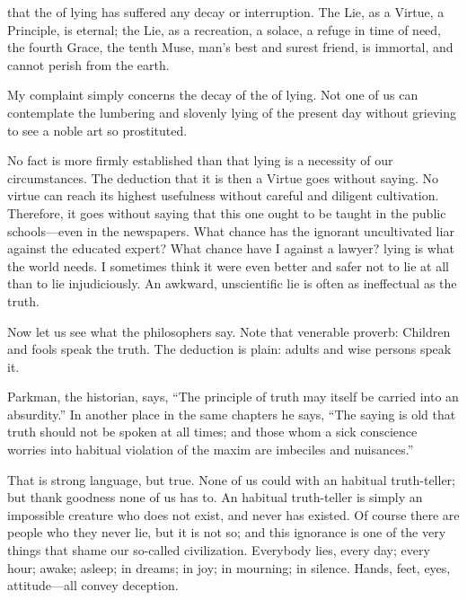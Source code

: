 \documentclass{novelette}
\begin{document}
\begin{opening}
\null\null\null\null\null\null
{}
\null
{}
\null\null\null\null\null
\end{opening}

 that the  of lying has
suffered any decay or interruption. The Lie, as a Virtue, a
Principle, is eternal; the Lie, as a recreation, a solace, a refuge in
time of need, the fourth Grace, the tenth Muse, man's best and surest
friend, is immortal, and cannot perish from the earth.

My complaint simply concerns the decay of the  of lying.
Not one of us can contemplate the lumbering and slovenly lying of the
present day without grieving to see a noble art so prostituted.

No fact is more firmly established than that lying is a necessity of our
circumstances. The deduction that it is then a Virtue goes without
saying. No virtue can reach its highest usefulness without careful and
diligent cultivation. Therefore, it goes without saying that this one
ought to be taught in the public schools---even in the newspapers. What
chance has the ignorant uncultivated liar against the educated expert?
What chance have I against a lawyer?  lying
is what the world needs. I sometimes think it were even better and safer
not to lie at all than to lie injudiciously. An awkward, unscientific
lie is often as ineffectual as the truth.

Now let us see what the philosophers say. Note that venerable proverb:
Children and fools  speak the truth. The deduction is plain:
adults and wise persons  speak it.


Parkman, the historian, says,
``The principle of truth may itself be carried into an absurdity.'' In
another place in the same chapters he says, ``The saying is old that
truth should not be spoken at all times; and those whom a sick
conscience worries into habitual violation of the maxim are imbeciles
and nuisances.''

That is strong language, but true.
None of us could  with an habitual truth-teller;
but thank goodness none of us has to. An habitual truth-teller is simply
an impossible creature who does not exist, and never has existed.
Of course there are people who  they
never lie, but it is not so; and this ignorance is one of the very
things that shame our so-called civilization. Everybody lies, every day;
every hour; awake; asleep; in dreams; in joy; in mourning; in silence.
Hands, feet, eyes, attitude---all convey deception.
\end{document}
